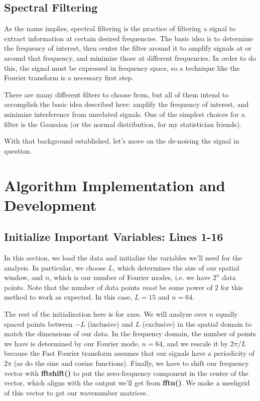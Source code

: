 \documentclass[a4paper,12 pt]{article}
\begin{document}
\subsection{Spectral Filtering}
As the name implies, spectral filtering is the practice of filtering a signal to extract information at certain desired frequencies. The basic idea is to determine the frequency of interest, then center the filter around it to amplify signals at or around that frequency, and minimize those at different frequencies. In order to do this, the signal must be expressed in frequency space, so a technique like the Fourier transform is a necessary first step. 

There are many different filters to choose from, but all of them intend to accomplish the basic idea described here: amplify the frequency of interest, and minimize interference from unrelated signals. One of the simplest choices for a filter is the Gaussian (or the normal distribution, for my statistician friends).

With that background established, let's move on the de-noising the signal in question.

\section{Algorithm Implementation and Development}
\subsection{Initialize Important Variables: Lines 1-16}
In this section, we load the data and initialize the variables we'll need for the analysis. In particular, we choose $L$, which determines the size of our spatial window, and $n$, which is our number of Fourier modes, i.e. we have $2^n$ data points. Note that the number of data points \textit{must} be some power of $2$ for this method to work as expected. In this case, $L=15$ and $n=64$.

The rest of the initialization here is for axes. We will analyze over $n$ equally spaced points between $-L$ (inclusive) and $L$ (exclusive) in the spatial domain to match the dimensions of our data. In the frequency domain,  the number of points we have is determined by our Fourier mode, $n=64$, and we rescale it by $2\pi/L$ because the Fast Fourier transform assumes that our signals have a periodicity of $2\pi$ (as do the sine and cosine functions).  Finally, we have to shift our frequency vector with \textbf{fftshift()} to put the zero-frequency component in the center of the vector, which aligns with the output we'll get from \textbf{fftn()}. We make a meshgrid of this vector to get our wavenumber matrices.
\end{document}
